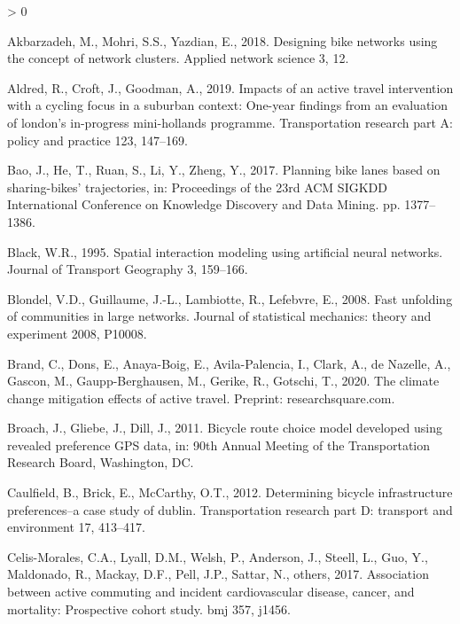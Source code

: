 \documentclass[
]{article}
\newlength{\cslhangindent}
\newenvironment{CSLReferences}[2] %
 {%
  \setlength{\parindent}{0pt}
  \ifodd #1 \everypar{\setlength{\hangindent}{\cslhangindent}}\ignorespaces\fi
  \ifnum #2 > 0
  \setlength{\parskip}{#2\baselineskip}
  \fi
 }%
 {}
\begin{document}
\hypertarget{refs}{}
\begin{CSLReferences}{1}{0}
\leavevmode\hypertarget{ref-akbarzadeh2018designing}{}%
Akbarzadeh, M., Mohri, S.S., Yazdian, E., 2018. Designing bike networks using the concept of network clusters. Applied network science 3, 12.

\leavevmode\hypertarget{ref-aldred2019impacts}{}%
Aldred, R., Croft, J., Goodman, A., 2019. Impacts of an active travel intervention with a cycling focus in a suburban context: One-year findings from an evaluation of london's in-progress mini-hollands programme. Transportation research part A: policy and practice 123, 147--169.

\leavevmode\hypertarget{ref-bao2017planning}{}%
Bao, J., He, T., Ruan, S., Li, Y., Zheng, Y., 2017. Planning bike lanes based on sharing-bikes' trajectories, in: Proceedings of the 23rd ACM SIGKDD International Conference on Knowledge Discovery and Data Mining. pp. 1377--1386.

\leavevmode\hypertarget{ref-black1995spatial}{}%
Black, W.R., 1995. Spatial interaction modeling using artificial neural networks. Journal of Transport Geography 3, 159--166.

\leavevmode\hypertarget{ref-blondel2008fast}{}%
Blondel, V.D., Guillaume, J.-L., Lambiotte, R., Lefebvre, E., 2008. Fast unfolding of communities in large networks. Journal of statistical mechanics: theory and experiment 2008, P10008.

\leavevmode\hypertarget{ref-brand_climate_2020}{}%
Brand, C., Dons, E., Anaya-Boig, E., Avila-Palencia, I., Clark, A., de Nazelle, A., Gascon, M., Gaupp-Berghausen, M., Gerike, R., Gotschi, T., 2020. The climate change mitigation effects of active travel. Preprint: researchsquare.com.

\leavevmode\hypertarget{ref-broach2011bicycle}{}%
Broach, J., Gliebe, J., Dill, J., 2011. Bicycle route choice model developed using revealed preference GPS data, in: 90th Annual Meeting of the Transportation Research Board, Washington, DC.

\leavevmode\hypertarget{ref-caulfield2012determining}{}%
Caulfield, B., Brick, E., McCarthy, O.T., 2012. Determining bicycle infrastructure preferences--a case study of dublin. Transportation research part D: transport and environment 17, 413--417.

\leavevmode\hypertarget{ref-celis2017association}{}%
Celis-Morales, C.A., Lyall, D.M., Welsh, P., Anderson, J., Steell, L., Guo, Y., Maldonado, R., Mackay, D.F., Pell, J.P., Sattar, N., others, 2017. Association between active commuting and incident cardiovascular disease, cancer, and mortality: Prospective cohort study. bmj 357, j1456.


\end{CSLReferences}
\end{document}
